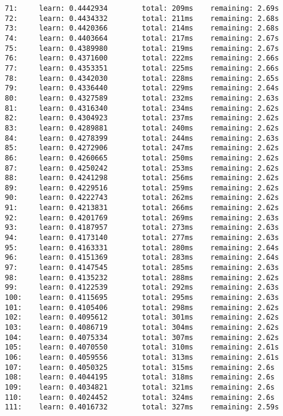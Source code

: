 \documentclass[11pt]{article}
\begin{document}
\begin{Verbatim}[commandchars=\\\{\}]
71:     learn: 0.4442934        total: 209ms    remaining: 2.69s
72:     learn: 0.4434332        total: 211ms    remaining: 2.68s
73:     learn: 0.4420366        total: 214ms    remaining: 2.68s
74:     learn: 0.4403664        total: 217ms    remaining: 2.67s
75:     learn: 0.4389980        total: 219ms    remaining: 2.67s
76:     learn: 0.4371600        total: 222ms    remaining: 2.66s
77:     learn: 0.4353351        total: 225ms    remaining: 2.66s
78:     learn: 0.4342030        total: 228ms    remaining: 2.65s
79:     learn: 0.4336440        total: 229ms    remaining: 2.64s
80:     learn: 0.4327589        total: 232ms    remaining: 2.63s
81:     learn: 0.4316340        total: 234ms    remaining: 2.62s
82:     learn: 0.4304923        total: 237ms    remaining: 2.62s
83:     learn: 0.4289881        total: 240ms    remaining: 2.62s
84:     learn: 0.4278399        total: 244ms    remaining: 2.63s
85:     learn: 0.4272906        total: 247ms    remaining: 2.62s
86:     learn: 0.4260665        total: 250ms    remaining: 2.62s
87:     learn: 0.4250242        total: 253ms    remaining: 2.62s
88:     learn: 0.4241298        total: 256ms    remaining: 2.62s
89:     learn: 0.4229516        total: 259ms    remaining: 2.62s
90:     learn: 0.4222743        total: 262ms    remaining: 2.62s
91:     learn: 0.4213831        total: 266ms    remaining: 2.62s
92:     learn: 0.4201769        total: 269ms    remaining: 2.63s
93:     learn: 0.4187957        total: 273ms    remaining: 2.63s
94:     learn: 0.4173140        total: 277ms    remaining: 2.63s
95:     learn: 0.4163331        total: 280ms    remaining: 2.64s
96:     learn: 0.4151369        total: 283ms    remaining: 2.64s
97:     learn: 0.4147545        total: 285ms    remaining: 2.63s
98:     learn: 0.4135232        total: 288ms    remaining: 2.62s
99:     learn: 0.4122539        total: 292ms    remaining: 2.63s
100:    learn: 0.4115695        total: 295ms    remaining: 2.63s
101:    learn: 0.4105406        total: 298ms    remaining: 2.62s
102:    learn: 0.4095612        total: 301ms    remaining: 2.62s
103:    learn: 0.4086719        total: 304ms    remaining: 2.62s
104:    learn: 0.4075334        total: 307ms    remaining: 2.62s
105:    learn: 0.4070550        total: 310ms    remaining: 2.61s
106:    learn: 0.4059556        total: 313ms    remaining: 2.61s
107:    learn: 0.4050325        total: 315ms    remaining: 2.6s
108:    learn: 0.4044195        total: 318ms    remaining: 2.6s
109:    learn: 0.4034821        total: 321ms    remaining: 2.6s
110:    learn: 0.4024452        total: 324ms    remaining: 2.6s
111:    learn: 0.4016732        total: 327ms    remaining: 2.59s

\end{Verbatim}
\end{document}
